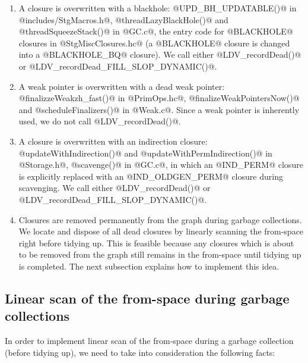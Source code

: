\documentclass{article}
\begin{document}
\begin{enumerate}
\item A closure is overwritten with a blackhole: 
  @UPD_BH_UPDATABLE()@ in @includes/StgMacros.h@,
  @threadLazyBlackHole()@ and @threadSqueezeStack()@ in @GC.c@,
  the entry code for @BLACKHOLE@ closures in @StgMiscClosures.hc@ (a 
  @BLACKHOLE@ closure is changed into a @BLACKHOLE_BQ@ closure).
  We call either @LDV_recordDead()@ or @LDV_recordDead_FILL_SLOP_DYNAMIC()@.

\item A weak pointer is overwritten with a dead weak pointer:
  @finalizzeWeakzh_fast()@ in @PrimOps.hc@, 
  @finalizeWeakPointersNow()@ and @scheduleFinalizers()@ in @Weak.c@.
  Since a weak pointer is inherently used, we do not call @LDV_recordDead()@.

\item A closure is overwritten with an indirection closure:
  @updateWithIndirection()@ and @updateWithPermIndirection()@ in @Storage.h@,
  @scavenge()@ in @GC.c@, in which an @IND_PERM@ closure is explicitly replaced
  with an @IND_OLDGEN_PERM@ closure during scavenging.
  We call either @LDV_recordDead()@ or @LDV_recordDead_FILL_SLOP_DYNAMIC()@.
  
\item Closures are removed permanently from the graph during garbage
collections.  We locate and dispose of all dead closures by linearly
scanning the from-space right before tidying up.  This is feasible
because any closures which is about to be removed from the graph still
remains in the from-space until tidying up is completed.  The next
subsection explains how to implement this idea.
\end{enumerate}

\subsection{Linear scan of the from-space during garbage collections}

In order to implement linear scan of the from-space during a garbage collection 
(before tidying up),
we need to take into consideration the following facts:
\end{document}
